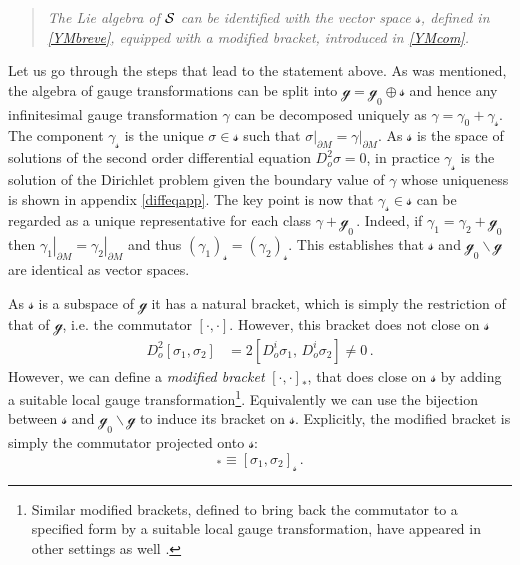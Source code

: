 \documentclass[11pt,a4paper]{article}
\def\calsg{{\boldsymbol{\mathscr g}}}
\def\cals{{\cal S}}
\def\calss{{\boldsymbol{\mathscr s}}}
\begin{document}
    \begin{quote}
    \textit{The Lie algebra of $\cals$ can be identified with the vector space $\calss$, defined in \eqref{YMbreve}, equipped with a modified bracket, introduced in \eqref{YMcom}.}
    \end{quote}
    
    Let us go through the steps that lead to the statement above. As was mentioned, the algebra of gauge transformations can be split into $\calsg=\calsg_0\oplus\calss$ and hence any infinitesimal gauge transformation $\gamma$ can be decomposed uniquely as $\gamma=\gamma_0+\gamma_\calss$. The component $\gamma_\calss$ is the unique $\sigma\in\calss$ such that $\left.\sigma\right|_{\partial M}=\left.\gamma\right|_{\partial M}$. As $\calss$ is the space of solutions of the second order differential equation $D_o^2\sigma=0$, in practice $\gamma_\calss$ is the solution of the Dirichlet problem given the boundary value of $\gamma$ whose uniqueness is shown in appendix \ref{diffeqapp}. The key point is now that $\gamma_\calss\in \calss$ can be regarded as a unique representative for each class $\gamma+\calsg_0$\,. Indeed, if $\gamma_1=\gamma_2+\calsg_0$ then $\left.\gamma_1\right|_{\partial M}=\left.\gamma_2\right|_{\partial M}$ and thus $(\gamma_1)_\calss=(\gamma_2)_\calss$. This establishes that $\calss$ and $\calsg_0\!\backslash \calsg$ are identical as vector spaces. 
    
    As $\calss$ is a subspace of $\calsg$ it has a natural bracket, which is simply the restriction of that of $\calsg$, i.e. the commutator $[\cdot,\cdot]$. However, this bracket does not close on $\calss$
    \begin{align}
    D_o^2 [\sigma_1,\sigma_2]&=2[D_o^i \sigma_1, \,D_o^i \sigma_2]\neq 0\,.
    \end{align}
    However, we can define a {\it modified bracket} $[\cdot,\cdot]_*$, that does close on $\calss$ by adding a suitable local gauge transformation\footnote{Similar modified brackets, defined to bring back the commutator to a specified form by a suitable local gauge transformation, have appeared in other settings as well \cite{Barnich:2010eb,Compere:2015knw}.}. Equivalently we can use the bijection between $\calss$ and $\calsg_0\backslash \calsg$ to induce its bracket on $\calss$. Explicitly, the modified bracket is simply the commutator projected onto $\calss$:
    \begin{equation}
    [\sigma_1,\sigma_2]_*\equiv [\sigma_1,\sigma_2]_\calss \label{YMcom}\,.
    \end{equation}
   
\end{document}
